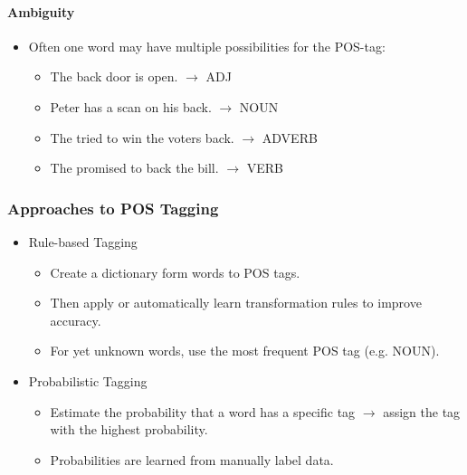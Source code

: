 \documentclass[a4paper, 11pt, accentcolor = tud3b]{tudreport}
\providecommand{\ambiguity}[1]{\textcolor{ambiguityorange}{#1}}
\begin{document}
                    \paragraph{Ambiguity} %
                        \begin{itemize}
                        	\item Often one word may have multiple possibilities for the POS-tag:
                        		\begin{itemize}
                        			\item The \ambiguity{back} door is open. \( \rightarrow \) ADJ
                        			\item Peter has a scan on his \ambiguity{back}. \( \rightarrow \) NOUN
                        			\item The tried to win the voters \ambiguity{back}. \( \rightarrow \) ADVERB
                        			\item The promised to \ambiguity{back} the bill. \( \rightarrow \) VERB
                        		\end{itemize}
                        \end{itemize}

                \subsubsection{Approaches to  POS Tagging} %
                    \begin{itemize}
                    	\item Rule-based Tagging
                    		\begin{itemize}
                    			\item Create a dictionary form words to POS tags.
                    			\item Then apply or automatically learn transformation rules to improve accuracy.
                    			\item For yet unknown words, use the most frequent POS tag (e.g. NOUN).
                    		\end{itemize}
                    	\item Probabilistic Tagging
                    		\begin{itemize}
                    			\item Estimate the probability that a word has a specific tag \( \rightarrow \) assign the tag with the highest probability.
                    			\item Probabilities are learned from manually label data.
                    		\end{itemize}
                    \end{itemize}
\end{document}
